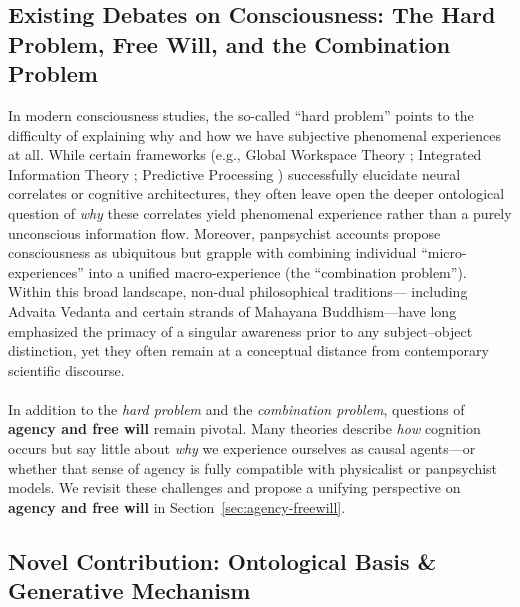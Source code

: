 \documentclass[12pt,a4paper]{article}
\begin{document}
\subsection{Existing Debates on Consciousness: The Hard Problem, Free Will, and the Combination Problem}

In modern consciousness studies, the so-called ``hard problem'' \cite{chalmers1995} points to the difficulty of explaining why and how we have subjective phenomenal experiences at all. While certain frameworks (e.g., Global Workspace Theory \cite{baars1988}; Integrated Information Theory \cite{tononi2008}; Predictive Processing \cite{friston2010}) successfully elucidate neural correlates or cognitive architectures, they often leave open the deeper ontological question of 
\emph{why} these correlates yield phenomenal experience rather than a purely unconscious information flow. Moreover, panpsychist accounts \cite{skrbinapsp} propose consciousness as ubiquitous but grapple with combining individual “micro-experiences” into a unified macro-experience (the ``combination problem''). Within this broad landscape, non-dual philosophical traditions---
including Advaita Vedanta and certain strands of Mahayana Buddhism---have long emphasized the primacy of a singular awareness prior to any subject--object distinction, yet they often remain at a conceptual distance from contemporary scientific discourse.

\paragraph{}
In addition to the \emph{hard problem} and the \emph{combination problem}, questions of \textbf{agency and free will} remain pivotal. Many theories describe \emph{how} cognition occurs but say little about \emph{why} we experience ourselves as causal agents—or whether that sense of agency is fully compatible with physicalist or panpsychist models. We revisit these challenges 
and propose a unifying perspective on \textbf{agency and free will} in Section~\ref{sec:agency-freewill}.


\subsection{Novel Contribution: Ontological Basis \& Generative Mechanism}
\end{document}
